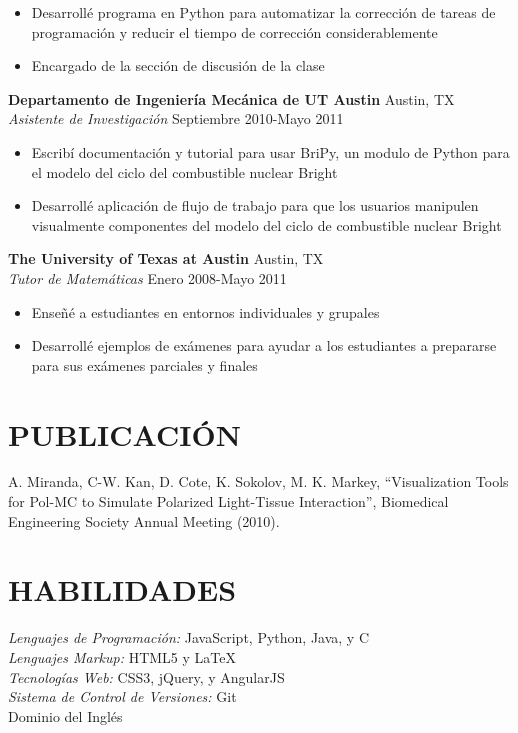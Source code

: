 \documentclass[line,margin,letterpaper]{res}
\begin{document}
\begin{resume}
\begin{itemize}
    \item Desarroll\'e programa en Python para automatizar la correcci\'on de 
    tareas de programaci\'on y reducir el tiempo de correcci\'on 
    considerablemente
    \item Encargado de la secci\'on de discusi\'on de la clase
  \end{itemize}
  {\bf Departamento de Ingenier\'ia Mec\'anica de UT Austin} 
    \hfill Austin, TX \\
  \emph{Asistente de Investigaci\'on} \hfill Septiembre 2010-Mayo 2011
  \begin{itemize} \itemsep -2pt
    \item Escrib\'i documentaci\'on y tutorial para usar BriPy, un modulo de 
    Python para el modelo del ciclo del combustible nuclear Bright
    \item Desarroll\'e aplicaci\'on de flujo de trabajo para que los usuarios 
    manipulen visualmente componentes del modelo del ciclo de combustible 
    nuclear Bright
  \end{itemize}
  {\bf The University of Texas at Austin} \hfill Austin, TX \\
  \emph{Tutor de Matem\'aticas} \hfill Enero 2008-Mayo 2011
  \begin{itemize} \itemsep -2pt
    \item Ense\~n\'e a estudiantes en entornos individuales y grupales
    \item Desarroll\'e ejemplos de ex\'amenes para ayudar a los estudiantes a 
    prepararse para sus ex\'amenes parciales y finales
  \end{itemize}
 
\section{PUBLICACI\'ON}
  A. Miranda, C-W. Kan, D. Cote, K. Sokolov, M. K. Markey, ``Visualization 
  Tools for Pol-MC to Simulate Polarized Light-Tissue Interaction'', 
  Biomedical Engineering Society Annual Meeting (2010).

\section{HABILIDADES}
  \emph{Lenguajes de Programaci\'on:} JavaScript, Python, Java, y C \\
  \emph{Lenguajes Markup:} HTML5 y \LaTeX \\
  \emph{Tecnolog\'ias Web:} CSS3, jQuery, y AngularJS \\
  \emph{Sistema de Control de Versiones:} Git \\
  Dominio del Ingl\'es

\end{resume}
\end{document}
